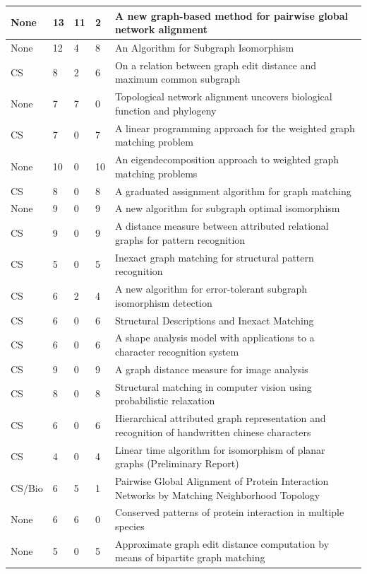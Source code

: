 \documentclass[12pt]{thesis}
\theoremstyle{plain}
\theoremstyle{definition}
\theoremstyle{remark}
\begin{document}
\begin{singlespace}
\begin{longtable}{|L{0.095\textwidth}|C{0.04\textwidth}|C{0.045\textwidth}|C{0.045\textwidth}|L{0.7\textwidth}|}
None & 13 & 11 & 2 & A new graph-based method for pairwise global network alignment \\ \hline
None & 12 & 4 & 8 & An Algorithm for Subgraph Isomorphism \\ \hline
CS & 8 & 2 & 6 & On a relation between graph edit distance and maximum common subgraph \\ \hline
None & 7 & 7 & 0 & Topological network alignment uncovers biological function and phylogeny \\ \hline
CS & 7 & 0 & 7 & A linear programming approach for the weighted graph matching problem \\ \hline
None & 10 & 0 & 10 & An eigendecomposition approach to weighted graph matching problems \\ \hline
CS & 8 & 0 & 8 & A graduated assignment algorithm for graph matching \\ \hline
None & 9 & 0 & 9 & A new algorithm for subgraph optimal isomorphism \\ \hline
CS & 9 & 0 & 9 & A distance measure between attributed relational graphs for pattern recognition \\ \hline
CS & 5 & 0 & 5 & Inexact graph matching for structural pattern recognition \\ \hline
CS & 6 & 2 & 4 & A new algorithm for error-tolerant subgraph isomorphism detection \\ \hline
CS & 6 & 0 & 6 & Structural Descriptions and Inexact Matching \\ \hline
CS & 6 & 0 & 6 & A shape analysis model with applications to a character recognition system \\ \hline
CS & 9 & 0 & 9 & A graph distance measure for image analysis \\ \hline
CS & 8 & 0 & 8 & Structural matching in computer vision using probabilistic relaxation \\ \hline
CS & 6 & 0 & 6 & Hierarchical attributed graph representation and recognition of handwritten chinese characters \\ \hline
CS & 4 & 0 & 4 & Linear time algorithm for isomorphism of planar graphs (Preliminary Report) \\ \hline
CS/Bio & 6 & 5 & 1 & Pairwise Global Alignment of Protein Interaction Networks by Matching Neighborhood Topology \\ \hline
None & 6 & 6 & 0 & Conserved patterns of protein interaction in multiple species \\ \hline
None & 5 & 0 & 5 & Approximate graph edit distance computation by means of bipartite graph matching \\ \hline

\end{longtable}
\end{singlespace}
\end{document}
